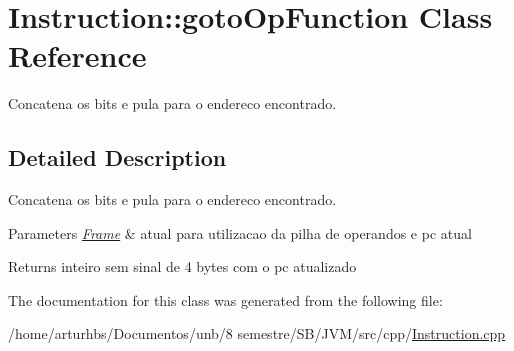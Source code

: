 \hypertarget{classInstruction_1_1gotoOpFunction}{}\section{Instruction\+:\+:goto\+Op\+Function Class Reference}
\label{classInstruction_1_1gotoOpFunction}


Concatena os bits e pula para o endereco encontrado.  




\subsection{Detailed Description}
Concatena os bits e pula para o endereco encontrado. 


\begin{DoxyParams}{Parameters}
{\em \hyperlink{classFrame}{Frame}} & atual para utilizacao da pilha de operandos e pc atual \\
\hline
\end{DoxyParams}
\begin{DoxyReturn}{Returns}
inteiro sem sinal de 4 bytes com o pc atualizado 
\end{DoxyReturn}


The documentation for this class was generated from the following file\+:\begin{DoxyCompactItemize}
\item 
/home/arturhbs/\+Documentos/unb/8 semestre/\+S\+B/\+J\+V\+M/src/cpp/\hyperlink{Instruction_8cpp}{Instruction.\+cpp}\end{DoxyCompactItemize}
